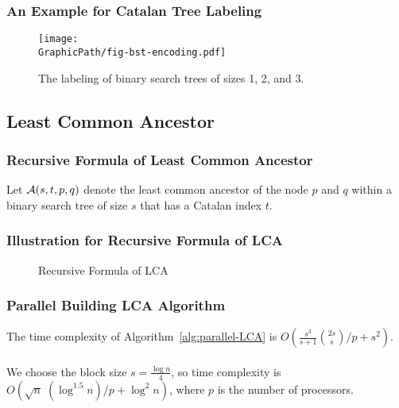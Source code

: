 \begin{frame}
	\frametitle{An Example for Catalan Tree Labeling}
	\begin{figure}[!thb]
	  \centering
	  \texttt{[image: \\GraphicPath/fig-bst-encoding.pdf]}
	  \caption{The labeling of binary search trees of sizes 1, 2, and 3.}
	  \label{fig:labelingBST}
	\end{figure}
\end{frame}

\subsection{Least Common Ancestor}
\begin{frame}
	\frametitle{Recursive Formula of Least Common Ancestor}
	Let ${\cal A}(s, t, p, q)$ denote the least common ancestor of the
	node $p$ and $q$ within a binary search tree of size $s$ that has a
	Catalan index $t$.
	\begin{center}
		\scalebox{.7} { \begin{minipage}{1.4\textwidth}
			
			\end{minipage}
		}
	\end{center}
\end{frame}

\begin{withoutheadline}
\begin{frame}
	\frametitle{Illustration for Recursive Formula of LCA}
	\begin{center}
		\scalebox{0.8} { \begin{minipage}{1\textwidth}
			\begin{figure}[!thb]
			  \centering {} 
			  \caption{Recursive Formula of LCA}
			\end{figure}
			\end{minipage}
		}
	\end{center}
\end{frame}
\end{withoutheadline}

\begin{frame}
	\frametitle{Parallel Building LCA Algorithm}
	The time complexity of Algorithm~\ref{alg:parallel-LCA} is
	$O(\frac{s^3}{s+1} \binom{2s}{s} / p + s^2)$.
	\\~\\
	We choose the block size $s = {{\frac{\log n}{4}}}$, so time
	complexity is $O(\sqrt{n} \; (\log^{1.5} n) / p + \log^2 n )$, where
	$p$ is the number of processors.
	\begin{center}
		\scalebox{.7} { \begin{minipage}{1.4\textwidth}
			
			\end{minipage}
		}
	\end{center}
\end{frame}

